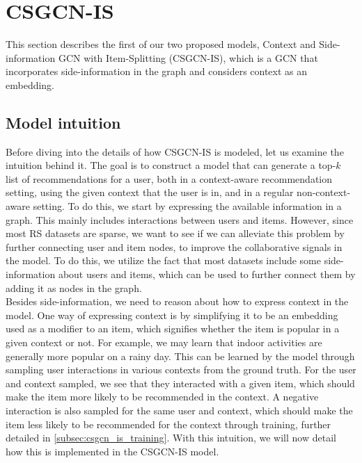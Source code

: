 \section{CSGCN-IS}\label{sec:csgcn_is}
This section describes the first of our two proposed models, Context and Side-information GCN with Item-Splitting (CSGCN-IS), which is a GCN that incorporates side-information in the graph and considers context as an embedding.

\subsection{Model intuition}\label{subsec:csgcn_is_intuition}
Before diving into the details of how CSGCN-IS is modeled, let us examine the intuition behind it.
The goal is to construct a model that can generate a top-$k$ list of recommendations for a user, both in a context-aware recommendation setting, using the given context that the user is in, and in a regular non-context-aware setting.
To do this, we start by expressing the available information in a graph.
This mainly includes interactions between users and items.
However, since most RS datasets are sparse, we want to see if we can alleviate this problem by further connecting user and item nodes, to improve the collaborative signals in the model.
To do this, we utilize the fact that most datasets include some side-information about users and items, which can be used to further connect them by adding it as nodes in the graph.\\
Besides side-information, we need to reason about how to express context in the model.
One way of expressing context is by simplifying it to be an embedding used as a modifier to an item, which signifies whether the item is popular in a given context or not.
For example, we may learn that indoor activities are generally more popular on a rainy day.
This can be learned by the model through sampling user interactions in various contexts from the ground truth.
For the user and context sampled, we see that they interacted with a given item, which should make the item more likely to be recommended in the context.
A negative interaction is also sampled for the same user and context, which should make the item less likely to be recommended for the context through training, further detailed in \autoref{subsec:csgcn_is_training}.
With this intuition, we will now detail how this is implemented in the CSGCN-IS model.


